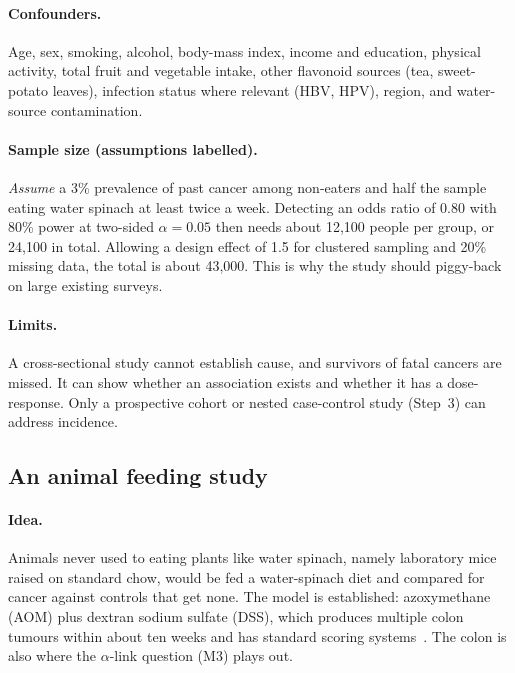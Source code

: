 \documentclass[11pt,a4paper]{article}
\begin{document}
\paragraph{Confounders.} Age, sex, smoking, alcohol, body-mass index, income and education, physical activity, total fruit and vegetable intake, other flavonoid sources (tea, sweet-potato leaves), infection status where relevant (HBV, HPV), region, and water-source contamination.

\paragraph{Sample size (assumptions labelled).} \emph{Assume} a 3\% prevalence of past cancer among non-eaters and half the sample eating water spinach at least twice a week. Detecting an odds ratio of 0.80 with 80\% power at two-sided $\alpha=0.05$ then needs about 12{,}100 people per group, or 24{,}100 in total. Allowing a design effect of 1.5 for clustered sampling and 20\% missing data, the total is about 43{,}000. This is why the study should piggy-back on large existing surveys.

\paragraph{Limits.} A cross-sectional study cannot establish cause, and survivors of fatal cancers are missed. It can show whether an association exists and whether it has a dose-response. Only a prospective cohort or nested case-control study (Step~3) can address incidence.

\subsection{An animal feeding study}
\label{sec:animal}

\paragraph{Idea.} Animals never used to eating plants like water spinach, namely laboratory mice raised on standard chow, would be fed a water-spinach diet and compared for cancer against controls that get none. The model is established: azoxymethane (AOM) plus dextran sodium sulfate (DSS), which produces multiple colon tumours within about ten weeks and has standard scoring systems~\cite{neufert2007}. The colon is also where the $\alpha$-link question (M3) plays out.
\end{document}
